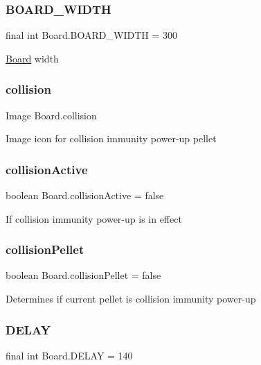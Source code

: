\subsubsection{\texorpdfstring{B\+O\+A\+R\+D\+\_\+\+W\+I\+D\+TH}{BOARD\_WIDTH}}
{\footnotesize\ttfamily final int Board.\+B\+O\+A\+R\+D\+\_\+\+W\+I\+D\+TH = 300}

\hyperlink{class_board}{Board} width \mbox{\label{class_board_a81bb96225cd77943f0fa0c3792f52422}} 
\subsubsection{\texorpdfstring{collision}{collision}}
{\footnotesize\ttfamily Image Board.\+collision}

Image icon for collision immunity power-\/up pellet \mbox{\label{class_board_ae1480c275ddcb277be70a914e5f90da6}} 
\subsubsection{\texorpdfstring{collision\+Active}{collisionActive}}
{\footnotesize\ttfamily boolean Board.\+collision\+Active = false}

If collision immunity power-\/up is in effect \mbox{\label{class_board_add2714db81c1d069077b60f04efecf58}} 
\subsubsection{\texorpdfstring{collision\+Pellet}{collisionPellet}}
{\footnotesize\ttfamily boolean Board.\+collision\+Pellet = false}

Determines if current pellet is collision immunity power-\/up \mbox{\label{class_board_a05fa7c307d2fc9f2813a728a85d1dad4}} 
\subsubsection{\texorpdfstring{D\+E\+L\+AY}{DELAY}}
{\footnotesize\ttfamily final int Board.\+D\+E\+L\+AY = 140}

